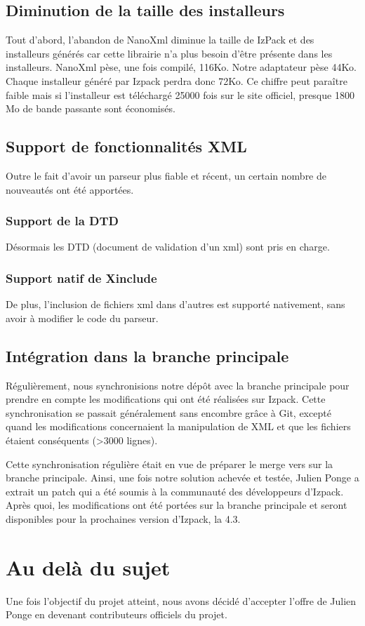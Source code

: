 \subsection{Diminution de la taille des installeurs}
Tout d'abord, l'abandon de NanoXml diminue la taille de IzPack et des installeurs générés car cette librairie n'a plus besoin d'être présente dans les installeurs.
NanoXml pèse, une fois compilé, 116Ko.
Notre adaptateur pèse 44Ko.
Chaque installeur généré par Izpack perdra donc 72Ko.
Ce chiffre peut paraître faible mais si l'installeur est téléchargé 25000 fois sur le site officiel, presque 1800 Mo de bande passante sont économisés.
\subsection{Support de fonctionnalités XML}
Outre le fait d'avoir un parseur plus fiable et récent, un certain nombre de nouveautés ont été apportées.
\subsubsection{Support de la DTD}
Désormais les DTD (document de validation d'un xml) sont pris en charge.
\subsubsection{Support natif de Xinclude}
De plus, l'inclusion de fichiers xml dans d'autres est supporté nativement, sans avoir à modifier le code du parseur.
\subsection{Intégration dans la branche principale}
Régulièrement, nous synchronisions notre dépôt avec la branche principale pour prendre en compte les modifications qui ont été réalisées sur Izpack.
Cette synchronisation se passait généralement sans encombre grâce à Git, excepté quand les modifications concernaient la manipulation de XML et que les fichiers étaient conséquents (>3000 lignes).

Cette synchronisation régulière était en vue de préparer le merge vers sur la branche principale.
Ainsi, une fois notre solution achevée et testée, Julien Ponge a extrait un patch qui a été soumis à la communauté des développeurs d'Izpack.
Après quoi, les modifications ont été portées sur la branche principale et seront disponibles pour la prochaines version d'Izpack, la 4.3.
\section{Au delà du sujet}
Une fois l'objectif du projet atteint, nous avons décidé d'accepter l'offre de Julien Ponge en devenant contributeurs officiels du projet.
